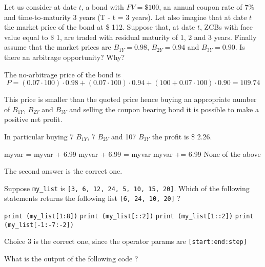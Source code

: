 \documentclass[12pt,a4paper]{exam}
\begin{document}
\question
Let us consider at date $t$, a bond with $FV = \$ 100$, an annual coupon rate of 7\% and time-to-maturity 3 years (T - t = 3 years).
Let also imagine that at date $t$ the market price of the bond at \$ 112.
Suppose that, at date $t$, ZCBs with face value equal to \$ 1, are traded with residual maturity of 1, 2 and 3 years.
Finally assume that the market prices are $B_{1Y} = 0.98$, $B_{2Y} = 0.94$ and $B_{3Y} = 0.90$.
Is there an arbitrage opportunity? Why?
\fillwithlines{3cm}
\begin{solution}
The no-arbitrage price of the bond is
\begin{equation*}
  P = (0.07\cdot100)\cdot 0.98 + (0.07\cdot100)\cdot 0.94 + (100 + 0.07\cdot100)\cdot 0.90 = 109.74
\end{equation*}

This price is smaller than the quoted price hence buying an appropriate number of $B_{1Y}$, $B_{2Y}$ and $B_{3Y}$ and selling the coupon bearing bond it is possible to make a positive net profit.

In particular buying 7 $B_{1Y}$, 7 $B_{2Y}$ and 107 $B_{3Y}$ the profit is \$ 2.26.
\end{solution}


\begin{checkboxes}
\choice myvar = myvar + 6.99
\choice myvar + 6.99 = myvar
\choice myvar += 6.99
\choice None of the above
\end{checkboxes}
\begin{solution}
The second answer is the correct one.
\end{solution}
\question
Suppose \texttt{my\_list} is \texttt{[3, 6, 12, 24, 5, 10, 15, 20]}.
Which of the following statements returns the following list \texttt{[6, 24, 10, 20]} ?

\begin{checkboxes}
\choice \texttt{print (my\_list[1:8])}
\choice \texttt{print (my\_list[::2])}
\choice \texttt{print (my\_list[1::2])}
\choice \texttt{print (my\_list[-1:-7:-2])}
\end{checkboxes}
\begin{solution}
Choice 3 is the correct one, since the operator params are \texttt{[start:end:step]}
\end{solution}

\question
What is the output of the following code ?
\end{document}
